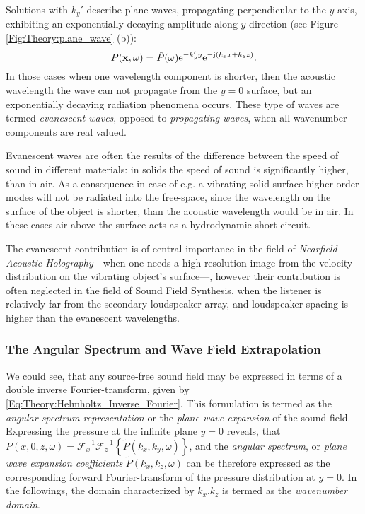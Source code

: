 Solutions with $k_y'$ describe plane waves, propagating perpendicular to the $y$-axis, exhibiting an exponentially decaying amplitude along $y$-direction (see Figure \ref{Fig:Theory:plane_wave} (b)):
\begin{equation}
P(\mathbf{x},\omega) = \hat{P}(\omega) \mathrm{e}^{-k_y' y} \mathrm{e}^{-\mathrm{j} \left( k_x x + k_z z \right) }.
\end{equation}
In those cases when one wavelength component is shorter, then the acoustic wavelength the wave can not propagate from the $y = 0$ surface, but an exponentially decaying radiation phenomena occurs. These type of waves are termed \emph{evanescent waves}, opposed to \emph{propagating waves}, when all wavenumber components are real valued.

Evanescent waves are often the results of the difference between the speed of sound in different materials: in solids the speed of sound is significantly higher, than in air. As a consequence in case of e.g. a vibrating solid surface higher-order modes will not be radiated into the free-space, since the wavelength on the surface of the object is shorter, than the acoustic wavelength would be in air. In these cases air above the surface acts as a hydrodynamic short-circuit.

The evanescent contribution is of central importance in the field of \emph{Nearfield Acoustic Holography}---when one needs a high-resolution image from the velocity distribution on the vibrating object's surface---, however their contribution is often neglected in the field of Sound Field Synthesis, when the listener is relatively far from the secondary loudspeaker array, and loudspeaker spacing is higher than the evanescent wavelengths.


\subsubsection{The Angular Spectrum and Wave Field Extrapolation}
We could see, that any source-free sound field may be expressed in terms of a double inverse Fourier-transform, given by \eqref{Eq:Theory:Helmholtz_Inverse_Fourier}.
This formulation is termed as the \emph{angular spectrum representation} \cite{Ahrens2010phd, Ahrens2012, Williams1999} or the \emph{plane wave expansion} \cite{Spors2005} of the sound field.
Expressing the pressure at the infinite plane $y=0$ reveals, that $P(x,0,z,\omega) = \mathcal{F}_x^{-1}\mathcal{F}_z^{-1} \left\{\tilde{P}(k_x,k_y, \omega)\right\}$,
and the \emph{angular spectrum}, or \emph{plane wave expansion coefficients} $\tilde{P}(k_x,k_z, \omega)$ can be therefore expressed as the corresponding forward Fourier-transform of the pressure distribution at $y=0$.%
In the followings, the domain characterized by $k_x$,$k_z$ is termed as the \emph{wavenumber domain}.

